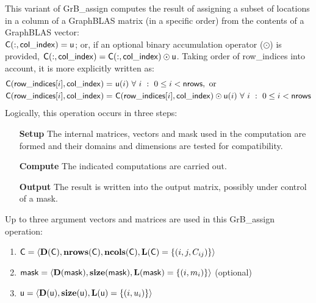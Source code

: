 This variant of {\sf GrB\_assign} computes the result of assigning a subset of
locations in a column of a GraphBLAS matrix (in a specific order) from the 
contents of a GraphBLAS vector: \\
${\sf C}(:,{\sf col\_index}) = {\sf u}$; or, if an 
optional binary accumulation operator ($\odot$) is provided, 
${\sf C}(:,{\sf col\_index}) = 
{\sf C}(:,{\sf col\_index}) \odot {\sf u}$. Taking order of {\sf row\_indices} 
into account, it is more explicitly written as:
\[
\begin{aligned}
    {\sf C}({\sf row\_indices}[i],{\sf col\_index}) = &\ {\sf u}(i) 
    \ \forall \ i \ : \ 0 \leq i < {\sf nrows}, \mbox{~or~}
    \\
    {\sf C}({\sf row\_indices}[i],{\sf col\_index}) = &\ 
    {\sf C}({\sf row\_indices}[i],{\sf col\_index}) \odot {\sf u}(i) 
    \ \forall \ i \ : \ 0 \leq i < {\sf nrows}
\end{aligned}
\]  
Logically, this operation occurs in three steps:
\begin{enumerate}[leftmargin=0.75in]
\item[\bf Setup] The internal matrices, vectors and mask used in the computation are formed 
and their domains and dimensions are tested for compatibility.
\item[\bf Compute] The indicated computations are carried out.
\item[\bf Output] The result is written into the output matrix, possibly under 
control of a mask.
\end{enumerate}

Up to three argument vectors and matrices are used in this {\sf GrB\_assign} 
operation:
\begin{enumerate}
	\item ${\sf C} = \langle \bold{D}({\sf C}),\bold{nrows}({\sf C}),
    \bold{ncols}({\sf C}),\bold{L}({\sf C}) = \{(i,j,C_{ij}) \} \rangle$
    
	\item ${\sf mask} = \langle \bold{D}({\sf mask}),\bold{size}({\sf mask}),
    \bold{L}({\sf mask}) = \{(i,m_{i}) \} \rangle$ (optional)

	\item ${\sf u} = \langle \bold{D}({\sf u}),\bold{size}({\sf u}),
    \bold{L}({\sf u}) = \{(i,u_i) \} \rangle$
\end{enumerate}

